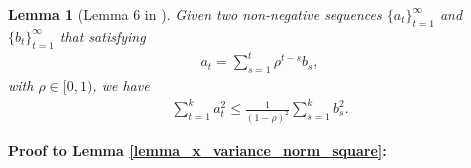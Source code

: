 \documentclass{article}
\newtheorem{Lemma}{\bf{Lemma}}
\begin{document}
\begin{Lemma}[Lemma $6$ in \citep{Tang:2018un}]
\label{lemma_hanlin_2}
Given two non-negative sequences $\{a_t\}_{t=1}^{\infty}$ and $\{b_t\}_{t=1}^{\infty}$ that satisfying
\begin{align}
\nonumber
a_t = \sum_{s=1}^t \rho^{t-s} b_s,
\end{align} with $\rho \in [0,1)$, we have
\begin{align}
\nonumber
\sum_{t=1}^k a_t^2 \le \frac{1}{(1-\rho)^2}\sum_{s=1}^k b_s^2.
\end{align}
\end{Lemma}





\textbf{ Proof to Lemma \ref{lemma_x_variance_norm_square}:}
%
\end{document}
